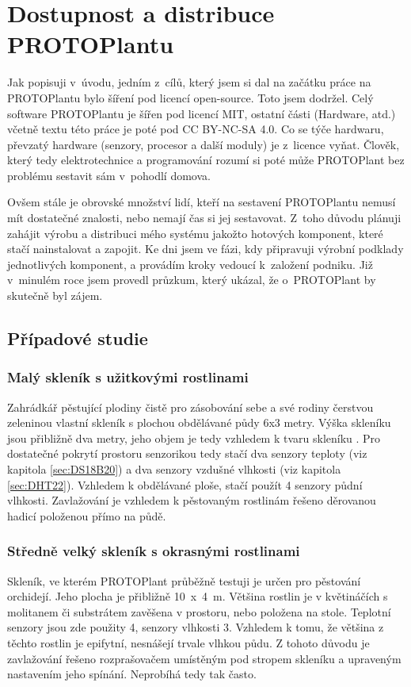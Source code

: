 \chapter{Dostupnost a distribuce PROTOPlantu}
Jak popisuji v~úvodu, jedním z~cílů, který jsem si dal na začátku práce na PROTOPlantu bylo šíření pod licencí open-source.
Toto jsem dodržel. 
Celý software PROTOPlantu je šířen pod licencí MIT, ostatní části (Hardware, atd.) včetně textu této práce je poté pod CC BY-NC-SA 4.0.
Co se týče hardwaru, převzatý hardware (senzory, procesor a další moduly) je z~licence vyňat.
Člověk, který tedy elektrotechnice a programování rozumí si poté může PROTOPlant bez problému sestavit sám v~pohodlí domova.

Ovšem stále je obrovské množství lidí, kteří na sestavení PROTOPlantu nemusí mít dostatečné znalosti, nebo nemají čas si jej sestavovat.
Z~toho důvodu plánuji zahájit výrobu a distribuci mého systému jakožto hotových komponent, které stačí nainstalovat a zapojit.
Ke dni  jsem ve fázi, kdy připravuji výrobní podklady jednotlivých komponent, a provádím kroky vedoucí k~založení podniku.
Již v~minulém roce jsem provedl průzkum, který ukázal, že o~PROTOPlant by skutečně byl zájem.

\section{Případové studie}

\subsection{Malý skleník s užitkovými rostlinami}
Zahrádkář pěstující plodiny čistě pro zásobování sebe a své rodiny čerstvou zeleninou vlastní skleník s plochou obdělávané půdy 6x3 metry.
Výška skleníku jsou přibližně dva metry, jeho objem je tedy vzhledem k tvaru skleníku .
Pro dostatečné pokrytí prostoru senzorikou tedy stačí dva senzory teploty (viz kapitola \ref{sec:DS18B20}) a dva senzory vzdušné vlhkosti (viz kapitola \ref{sec:DHT22}). 
Vzhledem k obdělávané ploše, stačí použít 4 senzory půdní vlhkosti.
Zavlažování je vzhledem k pěstovaným rostlinám řešeno děrovanou hadicí položenou přímo na půdě.


\subsection{Středně velký skleník s okrasnými rostlinami}
Skleník, ve kterém PROTOPlant průběžně testuji je určen pro pěstování orchidejí. 
Jeho plocha je přibližně 10~x~4~m.
Většina rostlin je v květináčích s molitanem či substrátem zavěšena v prostoru, nebo položena na stole.
Teplotní senzory jsou zde použity 4, senzory vlhkosti 3.
Vzhledem k tomu, že většina z těchto rostlin je epifytní, nesnášejí trvale vlhkou půdu. 
Z tohoto důvodu je zavlažování řešeno rozprašovačem umístěným pod stropem skleníku a upraveným nastavením jeho spínání.
Neprobíhá tedy tak často.


\newpage